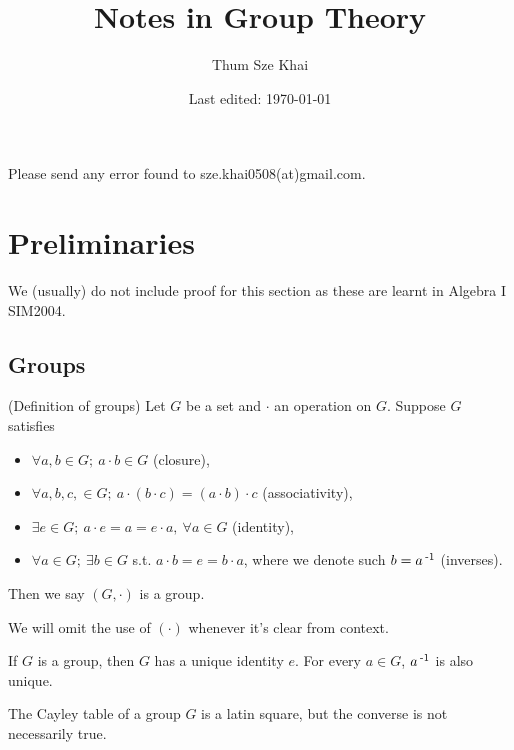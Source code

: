 \documentclass[12pt]{article}
\title{Notes in Group Theory}
\author{Thum Sze Khai}
\date{Last edited: \today}
\begin{document}
\begin{titlepage}
\thispagestyle{empty}
\maketitle

\vfill
Please send any error found to sze.khai0508(at)gmail.com.
\end{titlepage}

\newpage
\tableofcontents

\newpage

\section{Preliminaries}
We (usually) do not include proof for this section as these are learnt in Algebra I SIM2004.

\subsection{Groups}
	\begin{define}\label{definition-groups}
		(Definition of groups) Let $G$ be a set and $\cdot$ an operation on $G$. Suppose $G$ satisfies
		\begin{itemize}
			\item $\forall a,b \in G;\ a\cdot b\in G$ (closure),
			\item $\forall a,b,c,\in G;\ a\cdot(b\cdot c) = (a\cdot b) \cdot c$ (associativity),
			\item $\exists e\in G;\ a\cdot e=a=e\cdot a,\ \forall a\in G$ (identity),
			\item $\forall a\in G;\ \exists b\in G$ s.t. $a\cdot b=e=b\cdot a$, where we denote such $b = a\operatorname{^{-1}}$ (inverses).
		\end{itemize}

		Then we say $(G,\cdot)$ is a group. 
	\end{define}

	We will omit the use of $(\cdot)$ whenever it's clear from context.

	\begin{theorem}\label{uniqueness-of-identity-inv}
		If $G$ is a group, then $G$ has a unique identity $e$. For every $a\in G$, $a\operatorname{^{-1}}$ is also unique.
	\end{theorem}

	\begin{theorem}
		The Cayley table of a group $G$ is a latin square, but the converse is not necessarily true.
	\end{theorem}
\end{document}
